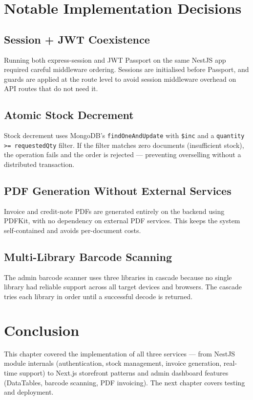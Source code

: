 \section{Notable Implementation Decisions}

\subsection{Session + JWT Coexistence}
Running both express-session and JWT Passport on the same NestJS app required
careful middleware ordering. Sessions are initialised before Passport, and guards
are applied at the route level to avoid session middleware overhead on API routes
that do not need it.

\subsection{Atomic Stock Decrement}
Stock decrement uses MongoDB's \texttt{findOneAndUpdate} with \texttt{\$inc} and a
\texttt{quantity >= requestedQty} filter. If the filter matches zero documents
(insufficient stock), the operation fails and the order is rejected --- preventing
overselling without a distributed transaction.

\subsection{PDF Generation Without External Services}
Invoice and credit-note PDFs are generated entirely on the backend using PDFKit,
with no dependency on external PDF services. This keeps the system self-contained
and avoids per-document costs.

\subsection{Multi-Library Barcode Scanning}
The admin barcode scanner uses three libraries in cascade because no single library
had reliable support across all target devices and browsers. The cascade tries each
library in order until a successful decode is returned.

\section*{Conclusion}
This chapter covered the implementation of all three services --- from NestJS module
internals (authentication, stock management, invoice generation, real-time support)
to Next.js storefront patterns and admin dashboard features (DataTables, barcode
scanning, PDF invoicing). The next chapter covers testing and deployment.
